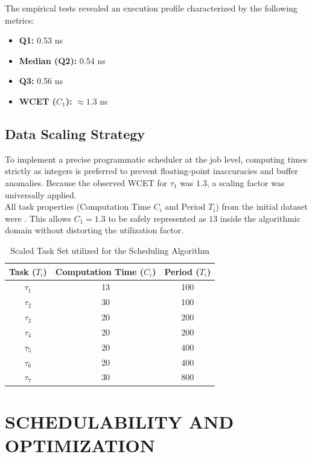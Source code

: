 \documentclass{report}
\begin{document}
The empirical tests revealed an execution profile characterized by the following metrics:
\begin{itemize}
    \item \textbf{Q1:} 0.53 ns
    \item \textbf{Median (Q2):} 0.54 ns
    \item \textbf{Q3:} 0.56 ns
    \item \textbf{WCET ($C_1$):} $\approx 1.3$ ns
\end{itemize}

\section{Data Scaling Strategy}
To implement a precise programmatic scheduler at the job level, computing times strictly as integers is preferred to prevent floating-point inaccuracies and buffer anomalies. Because the observed WCET for $\tau_1$ was $1.3$, a scaling factor was universally applied.\\

All task properties (Computation Time $C_i$ and Period $T_i$) from the initial dataset were . This allows $C_1 = 1.3$ to be safely represented as $13$ inside the algorithmic domain without distorting the utilization factor.

\begin{table}[H]
    \centering
    \begin{tabular}{| c | c | c |}
        \hline
        \textbf{Task ($T_i$)} & \textbf{Computation Time ($C_i$)} & \textbf{Period ($T_i$)} \\
        \hline
        $\tau_1$ & 13 & 100 \\
        \hline
        $\tau_2$ & 30 & 100 \\
        \hline
        $\tau_3$ & 20 & 200 \\
        \hline
        $\tau_4$ & 20 & 200 \\
        \hline
        $\tau_5$ & 20 & 400 \\
        \hline
        $\tau_6$ & 20 & 400 \\
        \hline
        $\tau_7$ & 30 & 800 \\
        \hline
    \end{tabular}
    \caption{Scaled Task Set utilized for the Scheduling Algorithm}
    \label{tab:scaled_taskset}
\end{table}

\chapter{SCHEDULABILITY AND OPTIMIZATION}
\end{document}
